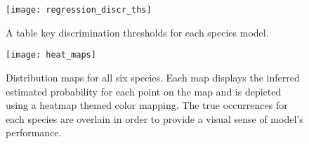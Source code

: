 \begin{figure}
    \texttt{[image: regression\_discr\_ths]}
    \caption{
        A table key discrimination thresholds for each species model.
    }
    \label{fig:regression_discr_ths}
\end{figure}



\begin{figure}
    \texttt{[image: heat\_maps]}
    \caption{
        Distribution maps for all six species.
        Each map displays the inferred estimated probability for each point on the map and is depicted using a heatmap themed color mapping.
        The true occurrences for each species are overlain in order to provide a visual sense of model's performance.
    }
    \label{fig:heat_maps}
\end{figure}


